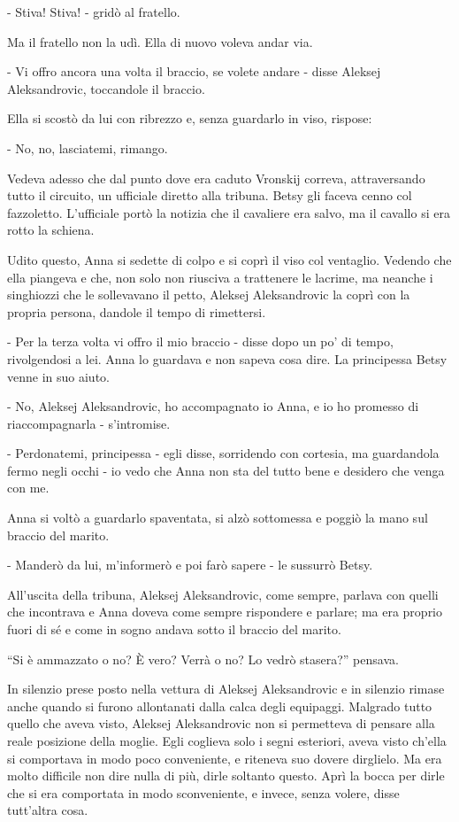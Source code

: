 - Stiva! Stiva! - gridò al fratello. 

Ma il fratello non la udì. Ella di nuovo voleva andar via. 

- Vi offro ancora una volta il braccio, se volete andare - disse Aleksej Aleksandrovic, toccandole il braccio. 

Ella si scostò da lui con ribrezzo e, senza guardarlo in viso, rispose: 

- No, no, lasciatemi, rimango. 

Vedeva adesso che dal punto dove era caduto Vronskij correva, attraversando tutto il circuito, un ufficiale diretto alla tribuna. Betsy gli faceva cenno col fazzoletto. L'ufficiale portò la notizia che il cavaliere era salvo, ma il cavallo si era rotto la schiena. 

Udito questo, Anna si sedette di colpo e si coprì il viso col ventaglio. Vedendo che ella piangeva e che, non solo non riusciva a trattenere le lacrime, ma neanche i singhiozzi che le sollevavano il petto, Aleksej Aleksandrovic la coprì con la propria persona, dandole il tempo di rimettersi. 

- Per la terza volta vi offro il mio braccio - disse dopo un po' di tempo, rivolgendosi a lei. Anna lo guardava e non sapeva cosa dire. La principessa Betsy venne in suo aiuto. 

- No, Aleksej Aleksandrovic, ho accompagnato io Anna, e io ho promesso di riaccompagnarla - s'intromise. 

- Perdonatemi, principessa - egli disse, sorridendo con cortesia, ma guardandola fermo negli occhi - io vedo che Anna non sta del tutto bene e desidero che venga con me. 

Anna si voltò a guardarlo spaventata, si alzò sottomessa e poggiò la mano sul braccio del marito. 

- Manderò da lui, m'informerò e poi farò sapere - le sussurrò Betsy. 

All'uscita della tribuna, Aleksej Aleksandrovic, come sempre, parlava con quelli che incontrava e Anna doveva come sempre rispondere e parlare; ma era proprio fuori di sé e come in sogno andava sotto il braccio del marito. 

``Si è ammazzato o no? È vero? Verrà o no? Lo vedrò stasera?'' pensava. 

In silenzio prese posto nella vettura di Aleksej Aleksandrovic e in silenzio rimase anche quando si furono allontanati dalla calca degli equipaggi. Malgrado tutto quello che aveva visto, Aleksej Aleksandrovic non si permetteva di pensare alla reale posizione della moglie. Egli coglieva solo i segni esteriori, aveva visto ch'ella si comportava in modo poco conveniente, e riteneva suo dovere dirglielo. Ma era molto difficile non dire nulla di più, dirle soltanto questo. Aprì la bocca per dirle che si era comportata in modo sconveniente, e invece, senza volere, disse tutt'altra cosa. 

